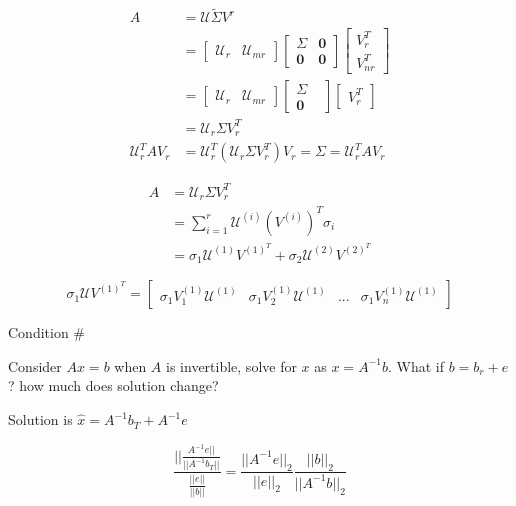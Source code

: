 \begin{align*}
A &= \mathcal{U}\tilde{\Sigma}V^r\\
&= 
\begin{bmatrix}
\mathcal{U}_r & \mathcal{U}_{mr}
\end{bmatrix}
\begin{bmatrix}
\Sigma & \mathbf{0}\\
\mathbf{0} & \mathbf{0}
\end{bmatrix}
\begin{bmatrix}
V_r^T\\
V_{nr}^T
\end{bmatrix}\\
&= 
\begin{bmatrix}
\mathcal{U}_r & \mathcal{U}_{mr}
\end{bmatrix}
\begin{bmatrix}
\Sigma \\
\mathbf{0} & 
\end{bmatrix}
\begin{bmatrix}
V_r^T
\end{bmatrix}\\
&= \mathcal{U}_r\Sigma V_r^T\\
\mathcal{U}_r^TAV_r &= \mathcal{U}_r^T(\mathcal{U}_r\Sigma V_r^T)V_r = \Sigma = \mathcal{U}_r^TAV_r
\end{align*}


\begin{align}
A &= \mathcal{U}_r\Sigma V_r^T \\
&= \sum^r_{i=1}\mathcal{U}^{(i)}(V^{(i)})^T\sigma_i\\
&= \sigma_1\mathcal{U}^{(1)}V^{(1)^T}+ \sigma_2\mathcal{U}^{(2)}V^{(2)^T}
\end{align}

\begin{equation*}
\sigma_1\mathcal{U}V^{(1)^T} = 
\begin{bmatrix}
\sigma_1V_1^{(1)}\mathcal{U}^{(1)} & \sigma_1V_2^{(1)}\mathcal{U}^{(1)} & ... & \sigma_1V_n^{(1)}\mathcal{U}^{(1)}
\end{bmatrix}
\end{equation*}

Condition \#

Consider $Ax = b$ when $A$ is invertible, solve for $x$ as $x = A^{-1}b$. What if $b = b_r + e$? how much does solution change? 

Solution is $\hat{x} = A^{-1}b_T + A^{-1}e$

\begin{equation*}
\frac{||\frac{A^{-1}e||}{||A^{-1}b_T||}}{\frac{||e||}{||b||}} = \frac{||A^{-1}e||_2}{||e||_2} \frac{||b||_2}{||A^{-1}b||_2}
\end{equation*}

